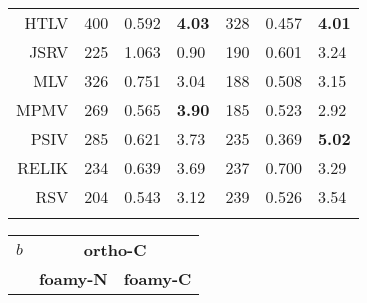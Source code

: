 \begin{table}
\begin{tabular}{r|lll|lll|}
HTLV   &  400  & 0.592 & {\bf 4.03} &  328  & 0.457 & {\bf 4.01} \\
JSRV   &  225  & 1.063 &      0.90  &  190  & 0.601 &      3.24  \\
MLV    &  326  & 0.751 &      3.04  &  188  & 0.508 &      3.15  \\
MPMV   &  269  & 0.565 & {\bf 3.90} &  185  & 0.523 &      2.92  \\
PSIV   &  285  & 0.621 &      3.73  &  235  & 0.369 & {\bf 5.02} \\
RELIK  &  234  & 0.639 &      3.69  &  237  & 0.700 &      3.29  \\
RSV    &  204  & 0.543 &      3.12  &  239  & 0.526 &      3.54  \\
\hline \hline
\vspace{10pt}
\end{tabular}
\begin{tabular}{r|lll|lll|}
$b$  & \multicolumn{6}{c|}{\bf ortho-C} \\
     & \multicolumn{3}{c|}{\bf foamy-N} & \multicolumn{3}{c|}{\bf foamy-C}  \\

\end{tabular}
\end{table}
